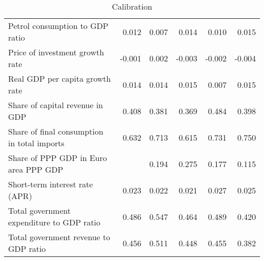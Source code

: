 \begin{table}[ht]
\begin{tabular}{lrrrrr}
  Petrol consumption 
 to GDP ratio  & 0.012 & 0.007 & 0.014 & 0.010 & 0.015 \\ 
  Price of investment 
 growth rate & -0.001 & 0.002 & -0.003 & -0.002 & -0.004 \\ 
  Real GDP per capita 
 growth rate & 0.014 & 0.014 & 0.015 & 0.007 & 0.015 \\ 
  Share of capital 
 revenue in GDP & 0.408 & 0.381 & 0.369 & 0.484 & 0.398 \\ 
  Share of final consumption 
 in total imports & 0.632 & 0.713 & 0.615 & 0.731 & 0.750 \\ 
  Share of PPP GDP 
 in Euro area PPP GDP &  & 0.194 & 0.275 & 0.177 & 0.115 \\ 
  Short-term 
 interest rate (APR) & 0.023 & 0.022 & 0.021 & 0.027 & 0.025 \\ 
  Total government 
 expenditure to GDP ratio & 0.486 & 0.547 & 0.464 & 0.489 & 0.420 \\ 
  Total government 
 revenue to GDP ratio & 0.456 & 0.511 & 0.448 & 0.455 & 0.382 \\ 
   \hline
\end{tabular}
\caption{Calibration} 
\end{table}
